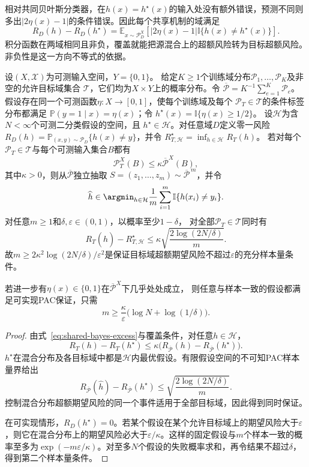 相对共同贝叶斯分类器，在$h(x)=h^\star(x)$的输入处没有额外错误，预测不同则多出$|2\eta(x)-1|$的条件错误。因此每个共享机制的域满足
\begin{equation}
 R_D(h)-R_D(h^\star)
 =\mathbb E_{x\sim\mathcal P_D^X}
   [|2\eta(x)-1|\mathbb I\{h(x)\neq h^\star(x)\}].
 \label{eq:shared-bayes-excess}
\end{equation}
积分函数在两域相同且非负，覆盖就能把源混合上的超额风险转为目标超额风险。非负性是这一方向不等式的依据。

\begin{theorem}[共享标签机制下的领域泛化]
\label{thm:dg-shared-pac}
设$(X,\mathcal X)$为可测输入空间，$Y=\{0,1\}$。
给定$K\geq1$个训练域分布$\mathcal P_1,\ldots,\mathcal P_K$及非空的允许目标域集合
$\mathcal T$，它们均为$X\times Y$上的概率分布。令
$\overline{\mathcal P}=K^{-1}\sum_{e=1}^K\mathcal P_e$。
假设存在同一个可测函数$\eta:X\to[0,1]$，使每个训练域及每个
$\mathcal P_T\in\mathcal T$的条件标签分布都满足
$\mathbb P(y=1\mid x)=\eta(x)$；令
$h^\star(x)=\mathbb I\{\eta(x)\geq1/2\}$。
设$\mathcal H$为含$N<\infty$个可测二分类假设的空间，且
$h^\star\in\mathcal H$。对任意域$D$定义零一风险
$R_D(h)=\mathbb P_{(x,y)\sim\mathcal P_D}\{h(x)\neq y\}$，并令
$R_{T,\mathcal H}^{\star}=\inf_{h\in\mathcal H}R_T(h)$。
若对每个$\mathcal P_T\in\mathcal T$与每个可测输入集合$B$都有
\[
 \mathcal P_T^X(B)\leq\kappa\overline{\mathcal P}^{X}(B),
\]
其中$\kappa>0$，则从$\overline{\mathcal P}$独立抽取
$S=(z_1,\ldots,z_m)\sim\overline{\mathcal P}^{\,m}$，并令
\[
 \widehat h\in\argmin_{h\in\mathcal H}
 \frac1m\sum_{i=1}^m\mathbb I\{h(x_i)\neq y_i\}.
\]
对任意$m\geq1$和$\delta,\varepsilon\in(0,1)$，以概率至少$1-\delta$，
对全部$\mathcal P_T\in\mathcal T$同时有
\begin{equation}
 R_T(\widehat h)-R_{T,\mathcal H}^{\star}
 \leq\kappa\sqrt{\frac{2\log(2N/\delta)}{m}}.
 \label{eq:dg-shared-pac}
\end{equation}
故$m\geq2\kappa^2\log(2N/\delta)/\varepsilon^2$是保证目标域超额期望风险不超过$\varepsilon$的充分样本量条件。

若进一步有$\eta(x)\in\{0,1\}$在$\overline{\mathcal P}^X$下几乎处处成立，
则任意与样本一致的假设都满足可实现PAC保证，只需
\[
 m\geq\frac{\kappa}{\varepsilon}
       \bigl(\log N+\log(1/\delta)\bigr).
\]
\end{theorem}
\begin{proof}
由式~\eqref{eq:shared-bayes-excess}与覆盖条件，对任意$h\in\mathcal H$，
\[
 R_T(h)-R_T(h^\star)
 \leq\kappa\bigl(R_{\overline{\mathcal P}}(h)
                  -R_{\overline{\mathcal P}}(h^\star)\bigr).
\]
$h^\star$在混合分布及各目标域中都是$\mathcal H$内最优假设。有限假设空间的不可知PAC样本量界给出
\[
 R_{\overline{\mathcal P}}(\widehat h)
 -R_{\overline{\mathcal P}}(h^\star)
 \leq\sqrt{\frac{2\log(2N/\delta)}{m}}.
\]
控制混合分布超额期望风险的同一个事件适用于全部目标域，因此得到同时保证。

在可实现情形，$R_D(h^\star)=0$。若某个假设在某个允许目标域上的期望风险大于$\varepsilon$，则它在混合分布上的期望风险必大于$\varepsilon/\kappa$。这样的固定假设与$m$个样本一致的概率至多为$\exp(-m\varepsilon/\kappa)$。对至多$N$个假设的失败概率求和，再令结果不超过$\delta$，得到第二个样本量条件。
\end{proof}

